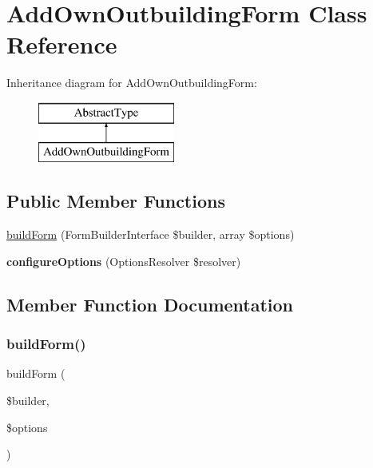 \hypertarget{class_app_1_1_forms_1_1_add_own_outbuilding_form}{}\section{Add\+Own\+Outbuilding\+Form Class Reference}
\label{class_app_1_1_forms_1_1_add_own_outbuilding_form}
Inheritance diagram for Add\+Own\+Outbuilding\+Form\+:\begin{figure}[H]
\begin{center}
\leavevmode
\includegraphics[height=2.000000cm]{class_app_1_1_forms_1_1_add_own_outbuilding_form}
\end{center}
\end{figure}
\subsection*{Public Member Functions}
\begin{DoxyCompactItemize}
\item 
\mbox{\hyperlink{class_app_1_1_forms_1_1_add_own_outbuilding_form_a83c3745710374f9c5a1eb0686fe2dfab}{build\+Form}} (Form\+Builder\+Interface \$builder, array \$options)
\item 
\mbox{\label{class_app_1_1_forms_1_1_add_own_outbuilding_form_a8ff68a86f5090b5df973286836e46ead}} 
{\bfseries configure\+Options} (Options\+Resolver \$resolver)
\end{DoxyCompactItemize}


\subsection{Member Function Documentation}
\mbox{\label{class_app_1_1_forms_1_1_add_own_outbuilding_form_a83c3745710374f9c5a1eb0686fe2dfab}} 
\subsubsection{\texorpdfstring{buildForm()}{buildForm()}}
{\footnotesize\ttfamily build\+Form (\begin{DoxyParamCaption}\item[{Form\+Builder\+Interface}]{\$builder,  }\item[{array}]{\$options }\end{DoxyParamCaption})}


